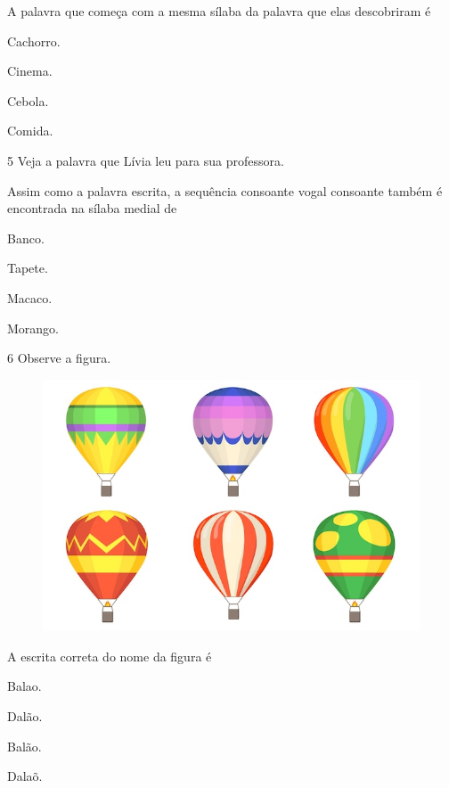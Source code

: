 A palavra que começa com a mesma sílaba da palavra que elas descobriram é

\begin{escolha}
\item Cachorro.

\item Cinema.

\item Cebola.

\item Comida.
\end{escolha}

\num{5} Veja a palavra que Lívia leu para sua professora.

Assim como a palavra escrita, a sequência consoante vogal consoante também é encontrada na sílaba medial de

\begin{escolha}
\item Banco.

\item Tapete.

\item Macaco.

\item Morango.
\end{escolha}

\num{6} Observe a figura.

\begin{figure}[htpb!]
\centering
\includegraphics[width=.5\textwidth]{media/image167.jpeg}
\end{figure}


A escrita correta do nome da figura é

\begin{escolha}
\item Balao.

\item Dalão.

\item Balão.

\item Dalaõ.
\end{escolha}


